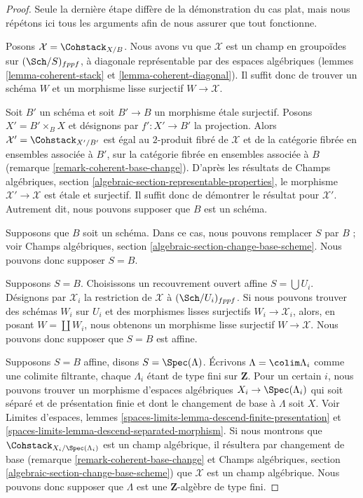 \begin{proof}
Seule la dernière étape diffère de la démonstration du cas plat, mais nous
répétons ici tous les arguments afin de nous assurer que tout fonctionne.

\medskip\noindent
Posons $\mathcal{X} = \Cohstack_{X/B}$. Nous avons vu que $\mathcal{X}$ est un
champ en groupoïdes sur $(\Sch/S)_{fppf}$, à diagonale représentable par des
espaces algébriques (lemmes \ref{lemma-coherent-stack} et
\ref{lemma-coherent-diagonal}). Il suffit donc de trouver un schéma $W$ et un
morphisme lisse surjectif $W \to \mathcal{X}$.

\medskip\noindent
Soit $B'$ un schéma et soit $B' \to B$ un morphisme \'etale surjectif. Posons
$X' = B' \times_B X$ et désignons par $f' : X' \to B'$ la projection. Alors
$\mathcal{X}' = \Cohstack_{X'/B'}$ est égal au $2$-produit fibré de
$\mathcal{X}$ et de la catégorie fibrée en ensembles associée à $B'$, sur la
catégorie fibrée en ensembles associée à $B$ (remarque
\ref{remark-coherent-base-change}). D'après les résultats de Champs
algébriques, section \ref{algebraic-section-representable-properties}, le
morphisme $\mathcal{X}' \to \mathcal{X}$ est \'etale et surjectif. Il suffit donc
de démontrer le résultat pour $\mathcal{X}'$. Autrement dit, nous pouvons
supposer que $B$ est un schéma.

\medskip\noindent
Supposons que $B$ soit un schéma. Dans ce cas, nous pouvons remplacer $S$ par
$B$ ; voir Champs algébriques, section
\ref{algebraic-section-change-base-scheme}. Nous pouvons donc supposer
$S = B$.

\medskip\noindent
Supposons $S = B$. Choisissons un recouvrement ouvert affine
$S = \bigcup U_i$. Désignons par $\mathcal{X}_i$ la restriction de
$\mathcal{X}$ à $(\Sch/U_i)_{fppf}$. Si nous pouvons trouver des schémas $W_i$
sur $U_i$ et des morphismes lisses surjectifs
$W_i \to \mathcal{X}_i$, alors, en posant $W = \coprod W_i$, nous obtenons un
morphisme lisse surjectif $W \to \mathcal{X}$. Nous pouvons donc supposer que
$S = B$ est affine.

\medskip\noindent
Supposons $S = B$ affine, disons $S = \Spec(\Lambda)$. Écrivons
$\Lambda = \colim \Lambda_i$ comme une colimite filtrante, chaque $\Lambda_i$
étant de type fini sur $\mathbf{Z}$. Pour un certain $i$, nous pouvons trouver
un morphisme d'espaces algébriques $X_i \to \Spec(\Lambda_i)$ qui soit séparé
et de présentation finie et dont le changement de base à $\Lambda$ soit $X$.
Voir Limites d'espaces, lemmes
\ref{spaces-limits-lemma-descend-finite-presentation} et
\ref{spaces-limits-lemma-descend-separated-morphism}. Si nous montrons que
$\Cohstack_{X_i/\Spec(\Lambda_i)}$ est un champ algébrique, il résultera par
changement de base (remarque \ref{remark-coherent-base-change} et Champs
algébriques, section \ref{algebraic-section-change-base-scheme}) que
$\mathcal{X}$ est un champ algébrique. Nous pouvons donc supposer que
$\Lambda$ est une $\mathbf{Z}$-algèbre de type fini.


\end{proof}
